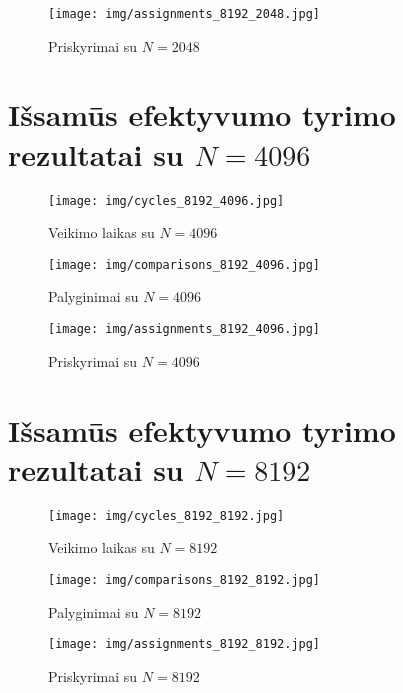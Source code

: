 \documentclass{VUMIFInfBakalaurinis}
\begin{document}
\begin{figure}[H]
  \centering
  \texttt{[image: img/assignments\_8192\_2048.jpg]}
  \caption{Priskyrimai su $N = 2048$}
\end{figure}

\section{Išsamūs efektyvumo tyrimo rezultatai su $N = 4096$}

\begin{figure}[H]
  \centering
  \texttt{[image: img/cycles\_8192\_4096.jpg]}
  \caption{Veikimo laikas su $N = 4096$}
\end{figure}

\begin{figure}[H]
  \centering
  \texttt{[image: img/comparisons\_8192\_4096.jpg]}
  \caption{Palyginimai su $N = 4096$}
\end{figure}

\begin{figure}[H]
  \centering
  \texttt{[image: img/assignments\_8192\_4096.jpg]}
  \caption{Priskyrimai su $N = 4096$}
\end{figure}

\section{Išsamūs efektyvumo tyrimo rezultatai su $N = 8192$}

\begin{figure}[H]
  \centering
  \texttt{[image: img/cycles\_8192\_8192.jpg]}
  \caption{Veikimo laikas su $N = 8192$}
\end{figure}

\begin{figure}[H]
  \centering
  \texttt{[image: img/comparisons\_8192\_8192.jpg]}
  \caption{Palyginimai su $N = 8192$}
\end{figure}

\begin{figure}[H]
  \centering
  \texttt{[image: img/assignments\_8192\_8192.jpg]}
  \caption{Priskyrimai su $N = 8192$}
\end{figure}
\end{document}

